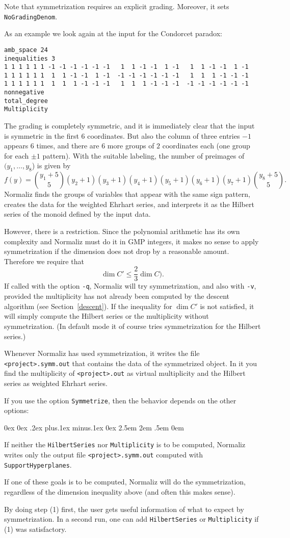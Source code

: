 \documentclass[12pt,a4paper]{scrartcl}
\newcounter{listi}
\newcommand{\stdli}{ \topsep0ex \partopsep0ex %
\parsep.2ex plus.1ex minus.1ex \itemsep0ex%
\leftmargin2.5em \labelwidth2em \labelsep.5em \rightmargin0em}%
\newenvironment{arab}{\begin{list}{\textup{(\arabic{listi})}}%
	{\usecounter{listi}\stdli}}{\end{list}}
\theoremstyle{definition}
\begin{document}
Note that symmetrization requires an explicit grading. Moreover, it sets \verb|NoGradingDenom|.

As an example we look again at the input for the Condorcet paradox:
\begin{Verbatim}
amb_space 24
inequalities 3
1 1 1 1 1 1 -1 -1 -1 -1 -1 -1   1  1 -1 -1  1 -1   1  1 -1 -1  1 -1
1 1 1 1 1 1  1  1 -1 -1  1 -1  -1 -1 -1 -1 -1 -1   1  1  1 -1 -1 -1
1 1 1 1 1 1  1  1  1 -1 -1 -1   1  1  1 -1 -1 -1  -1 -1 -1 -1 -1 -1
nonnegative
total_degree
Multiplicity
\end{Verbatim}
The grading is completely symmetric, and it is immediately clear that the input is symmetric in the first $6$ coordinates. But also the column of three entries $-1$ appears $6$ times, and there are $6$ more groups of $2$ coordinates each (one group for each $\pm1$ pattern). With the suitable labeling, the number of preimages of$(y_1,\dots,y_8$) is given by
$$
f(y)=\binom{y_1+5}{5}(y_2+1)(y_3+1)(y_4+1)(y_5+1)(y_6+1)(y_7+1)\binom{y_8+5}{5}.
$$
Normaliz finds the groups of variables that appear with the same sign pattern, creates the data for the weighted Ehrhart series, and interprets it as the Hilbert series of the monoid defined by the input data.

However, there is a restriction. Since the polynomial arithmetic has its own complexity and Normaliz must do it in GMP integers, it makes no sense to apply symmetrization if the dimension does not drop by a reasonable amount. Therefore we require that
$$
\dim C' \le \frac{2}{3}\dim C).
$$
If called with the option \verb|-q|, Normaliz will try symmetrization, and also with \verb|-v|, provided the multiplicity has not already been computed by the descent algorithm (see Section~\ref{descent}). If the inequality for $\dim C'$ is not satisfied, it will simply compute the Hilbert series or the multiplicity without symmetrization. (In default mode it of course tries symmetrization for the Hilbert series.)

Whenever Normaliz has used symmetrization, it writes the file \verb|<project>.symm.out| that contains the data of the symmetrized object. In it you find the multiplicity of \verb|<project>.out| as virtual multiplicity and the Hilbert series as weighted Ehrhart series.

If you use the option \verb|Symmetrize|, then the behavior depends on the other options:
\begin{arab}
	\item If neither the \verb|HilbertSeries| nor \verb|Multiplicity| is to be computed, Normaliz writes only the output file \verb|<project>.symm.out| computed with \verb|SupportHyperplanes|.
	\item If one of these goals is to be computed, Normaliz will do the symmetrization, regardless of the dimension inequality above (and often this makes sense).
\end{arab}
By doing step (1) first, the user gets useful information of what to expect by symmetrization. In a second run, one can add \verb|HilbertSeries| or \verb|Multiplicity| if (1) was satisfactory.
\end{document}
